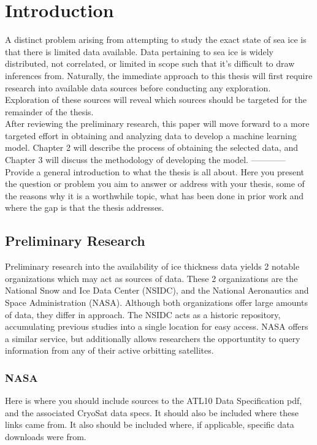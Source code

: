 \chapter{Introduction}
\label{sec:Introduction}

A distinct problem arising from attempting to study the exact state of sea ice is that there is limited data available. Data pertaining to sea ice is widely distributed, not correlated, or limited in scope such that it's difficult to draw inferences from. Naturally, the immediate approach to this thesis will first require research into available data sources before conducting any exploration. Exploration of these sources will reveal which sources should be targeted for the remainder of the thesis.
\\
\indent After reviewing the preliminary research, this paper will move forward to a more targeted effort in obtaining and analyzing data to develop a machine learning model. Chapter 2 will describe the process of obtaining the selected data, and Chapter 3 will discuss the methodology of developing the model.
------------
\\
Provide a general introduction to what the thesis is all about. Here you present the question or problem you aim to answer or address with your thesis, some of the reasons why it is a worthwhile topic, what has been done in prior work and where the gap is that the thesis addresses.

\section{Preliminary Research}
Preliminary research into the availability of ice thickness data yields 2 notable organizations which may act as sources of data. These 2 organizations are the National Snow and Ice Data Center (NSIDC), and the National Aeronautics and Space Administration (NASA). Although both organizations offer large amounts of data, they differ in approach. The NSIDC acts as a historic repository, accumulating previous studies into a single location for easy access. NASA offers a similar service, but additionally allows researchers the opportuntity to query information from any of their active orbitting satellites.

\subsection*{NASA}
Here is where you should include sources to the ATL10 Data Specification pdf, and the associated CryoSat data specs. It should also be included where these links came from. It also should be included where, if applicable, specific data downloads were from.


